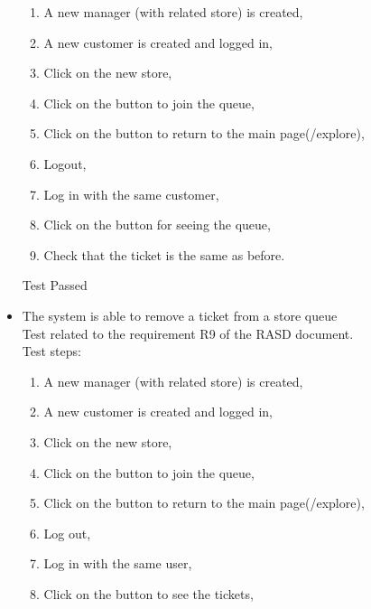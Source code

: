 \begin{itemize}
\begin{enumerate}
        \item A new manager (with related store) is created,

        \item A new customer is created and logged in,

        \item Click on the new store,

        \item Click on the button to join the queue,

        \item Click on the button to return to the main page(/explore),

        \item Logout,

        \item Log in with the same customer,

        \item Click on the button for seeing the queue,

        \item Check that the ticket is the same as before.
    \end{enumerate}
    Test Passed

    \item The system is able to remove a ticket from a store queue \\
    Test related to the requirement R9 of the RASD document. \\
    Test steps:\\
    \begin{enumerate}
        \item A new manager (with related store) is created,

        \item A new customer is created and logged in,

        \item Click on the new store,

        \item Click on the button to join the queue,

        \item Click on the button to return to the main page(/explore),

        \item Log out,

        \item Log in with the same user,

        \item Click on the button to see the tickets,


\end{enumerate}
\end{itemize}
